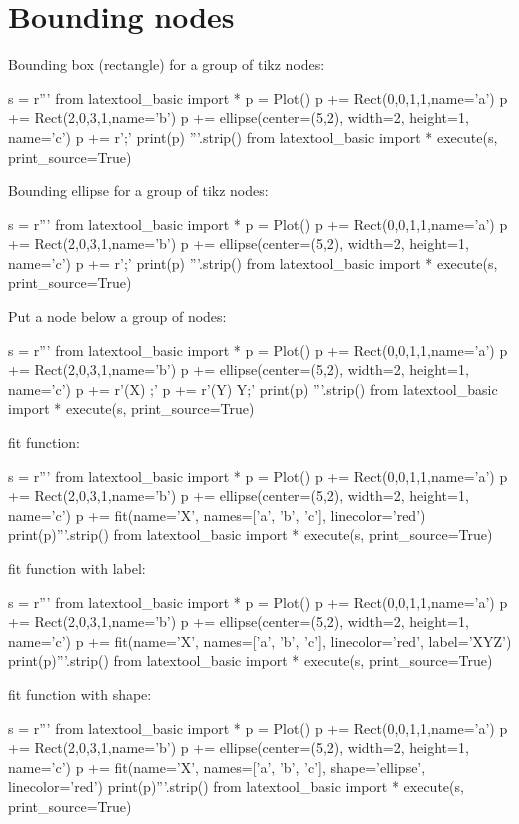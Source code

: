 \section{Bounding nodes}

Bounding box (rectangle) for a group of tikz nodes:
\begin{python}
s = r'''
from latextool_basic import *
p = Plot()
p += Rect(0,0,1,1,name='a')
p += Rect(2,0,3,1,name='b')
p += ellipse(center=(5,2), width=2, height=1, name='c')
p += r'\node [draw=black, fit=(a) (b) (c), line width=0.1cm, inner sep=0.0cm] {};'
print(p)
'''.strip()
from latextool_basic import *
execute(s, print_source=True)
\end{python}

Bounding ellipse for a group of tikz nodes:
\begin{python}
s = r'''
from latextool_basic import *
p = Plot()
p += Rect(0,0,1,1,name='a')
p += Rect(2,0,3,1,name='b')
p += ellipse(center=(5,2), width=2, height=1, name='c')
p += r'\node [ellipse, draw=black, fit=(a) (b) (c), line width=0.1cm, inner sep=0.0cm] {};'
print(p)
'''.strip()
from latextool_basic import *
execute(s, print_source=True)
\end{python}



Put a node below a group of nodes:
\begin{python}
s = r'''
from latextool_basic import *
p = Plot()
p += Rect(0,0,1,1,name='a')
p += Rect(2,0,3,1,name='b')
p += ellipse(center=(5,2), width=2, height=1, name='c')
p += r'\node [draw=black, fit=(a) (b) (c), inner sep=0.0cm, dashed] (X) {};'
p += r'\node [draw=black, rectangle, minimum width=1cm, below=1cm  of X, minimum height=1cm, distance=2cm] (Y) {Y};'
print(p)
'''.strip()
from latextool_basic import *
execute(s, print_source=True)
\end{python}

fit function:
\begin{python}
s = r'''
from latextool_basic import *
p = Plot()
p += Rect(0,0,1,1,name='a')
p += Rect(2,0,3,1,name='b')
p += ellipse(center=(5,2), width=2, height=1, name='c')
p += fit(name='X', names=['a', 'b', 'c'], linecolor='red')
print(p)'''.strip()
from latextool_basic import *
execute(s, print_source=True)
\end{python}

fit function with label:
\begin{python}
s = r'''
from latextool_basic import *
p = Plot()
p += Rect(0,0,1,1,name='a')
p += Rect(2,0,3,1,name='b')
p += ellipse(center=(5,2), width=2, height=1, name='c')
p += fit(name='X', names=['a', 'b', 'c'], linecolor='red', label='XYZ')
print(p)'''.strip()
from latextool_basic import *
execute(s, print_source=True)
\end{python}

fit function with shape:
\begin{python}
s = r'''
from latextool_basic import *
p = Plot()
p += Rect(0,0,1,1,name='a')
p += Rect(2,0,3,1,name='b')
p += ellipse(center=(5,2), width=2, height=1, name='c')
p += fit(name='X', names=['a', 'b', 'c'], shape='ellipse', linecolor='red')
print(p)'''.strip()
from latextool_basic import *
execute(s, print_source=True)
\end{python}
